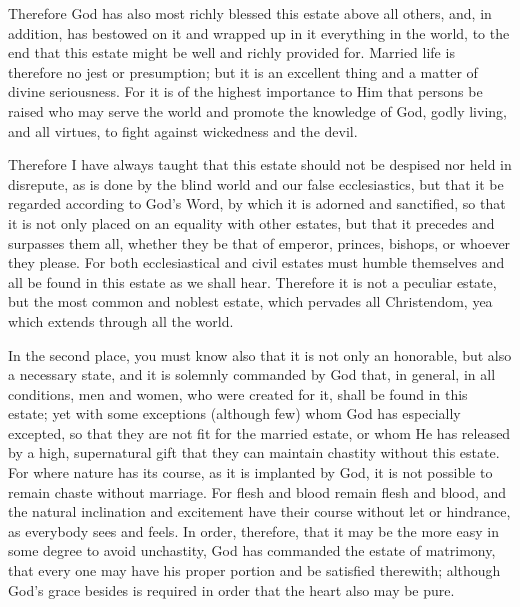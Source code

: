 Therefore God has also most richly blessed this estate above all
others, and, in addition, has bestowed on it and wrapped up in it
everything in the world, to the end that this estate might be well and
richly provided for. Married life is therefore no jest or presumption;
but it is an excellent thing and a matter of divine seriousness. For it
is of the highest importance to Him that persons be raised who may
serve the world and promote the knowledge of God, godly living, and all
virtues, to fight against wickedness and the devil.

Therefore I have always taught that this estate should not be despised
nor held in disrepute, as is done by the blind world and our false
ecclesiastics, but that it be regarded according to God's Word, by
which it is adorned and sanctified, so that it is not only placed on an
equality with other estates, but that it precedes and surpasses them
all, whether they be that of emperor, princes, bishops, or whoever they
please. For both ecclesiastical and civil estates must humble
themselves and all be found in this estate as we shall hear. Therefore
it is not a peculiar estate, but the most common and noblest estate,
which pervades all Christendom, yea which extends through all the
world.

In the second place, you must know also that it is not only an
honorable, but also a necessary state, and it is solemnly commanded by
God that, in general, in all conditions, men and women, who were
created for it, shall be found in this estate; yet with some exceptions
(although few) whom God has especially excepted, so that they are not
fit for the married estate, or whom He has released by a high,
supernatural gift that they can maintain chastity without this estate.
For where nature has its course, as it is implanted by God, it is not
possible to remain chaste without marriage. For flesh and blood remain
flesh and blood, and the natural inclination and excitement have their
course without let or hindrance, as everybody sees and feels. In
order, therefore, that it may be the more easy in some degree to avoid
unchastity, God has commanded the estate of matrimony, that every one
may have his proper portion and be satisfied therewith; although God's
grace besides is required in order that the heart also may be pure.

